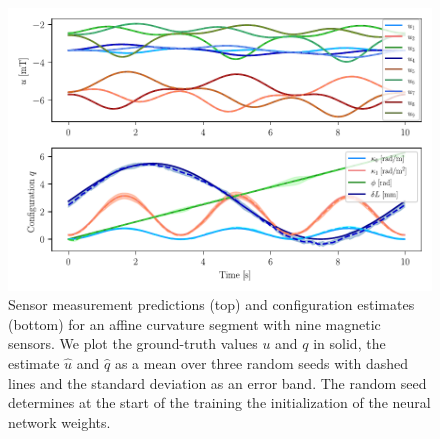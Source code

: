 \begin{figure}[hbt]
  \centering
  \includegraphics[width=0.8\columnwidth]{promasens/figures/simulation_results/ac/affine_curvature_inference_v2_cropped.pdf}
  \caption{Sensor measurement predictions (top) and configuration estimates (bottom) for an affine curvature segment with nine magnetic sensors. We plot the ground-truth values $u$ and $q$ in solid, the estimate $\hat{u}$ and $\hat{q}$ as a mean over three random seeds with dashed lines and the standard deviation as an error band. The random seed determines at the start of the training the initialization of the neural network weights.}
  \label{fig:promasens:ac_simulations:inference_plot}
\end{figure}

